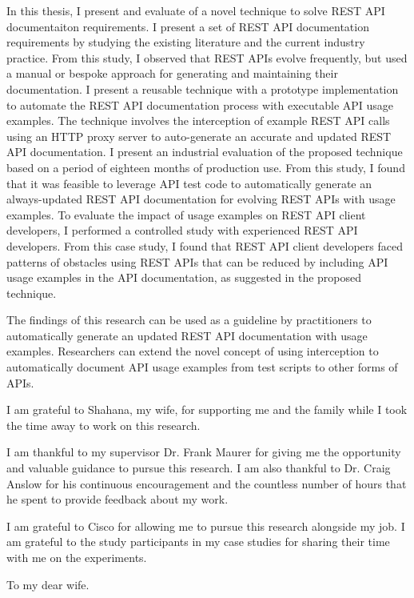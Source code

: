 \documentclass[12pt]{ucalgthes1}
\begin{document}
In this thesis, I present and evaluate of a novel technique to solve REST API documentaiton requirements. I present a set of REST API documentation requirements by studying the existing literature and the current industry practice. From this study, I observed that REST APIs evolve frequently, but used a manual or bespoke approach for generating and maintaining their documentation. I present a reusable technique with a prototype implementation to automate the REST API documentation process with executable API usage examples. The technique involves the interception of example REST API calls using an HTTP proxy server to auto-generate an accurate and updated REST API documentation. I present an industrial evaluation of the proposed technique based on a period of eighteen months of production use. From this study, I found that it was feasible to leverage API test code to automatically generate an always-updated REST API documentation for evolving REST APIs with usage examples. To evaluate the impact of usage examples on REST API client developers, I performed a controlled study with experienced REST API developers. From this case study, I found that REST API client developers faced patterns of obstacles using REST APIs that can be reduced by including API usage examples in the API documentation, as suggested in the proposed technique.

The findings of this research can be used as a guideline by practitioners to automatically generate an updated REST API documentation with usage examples. Researchers can extend the novel concept of using interception to automatically document API usage examples from test scripts to other forms of APIs.

\newpage
{}
{}
\begin{singlespace}
I am grateful to Shahana, my wife, for supporting me and the family while I took the time away to work on this research.

I am thankful to my supervisor Dr. Frank Maurer for giving me the opportunity and valuable guidance to pursue this research. I am also thankful to Dr. Craig Anslow for his continuous encouragement and the countless number of hours that he spent to provide feedback about my work.

I am grateful to Cisco for allowing me to pursue this research alongside my job. I am grateful to the study participants in my case studies for sharing their time with me on the experiments.
\newpage
{}
{}
\begin{center}
  To my dear wife.
\end{center}
\newpage
{}
\tableofcontents
\pagestyle{plain}
\newpage
{}
\listoftables
\pagestyle{plain}
\newpage
{}
\listoffigures
\pagestyle{plain}
\clearpage
\clearpage          %
\end{singlespace}
\newpage
{}
\end{document}
